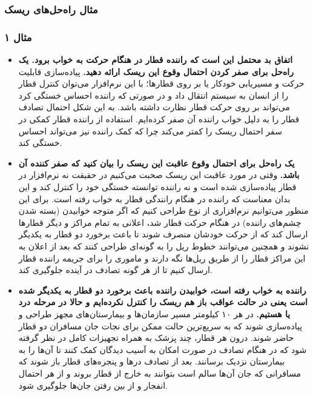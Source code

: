 \subsubsection{مثال راه‌حل‌های ریسک}

\subsubsection*{مثال ۱}

\begin{itemize}
    \item \textbf{اتفاق بد محتمل این است که راننده قطار در هنگام حرکت به خواب
    برود. یک راه‌حل برای صفر کردن احتمال وقوع این ریسک ارائه دهید.} پیاده‌سازی
    قابلیت حرکت و مسیریابی خودکار یا  بر روی قطا‌ر‌ها؛ با این
    نرم‌افزار می‌توان کنترل قطار را از انسان به سیستم انتقال داد و در صورتی که
    راننده احساس خستگی کرد می‌تواند بر روی حرکت قطار نظارت داشته باشد. به این
    شکل احتمال تصادف قطار را به دلیل خواب راننده آن صفر کرده‌ایم. استفاده از
    راننده قطار کمکی در سفر احتمال ریسک را کمتر می‌کند چرا که کمک راننده نیز
    می‌تواند احساس خستگی کند.
    \item \textbf{یک راه‌حل برای احتمال وقوع عاقبت این ریسک را بیان کنید که صفر
    کننده آن باشد.} وقتی در مورد عاقبت این ریسک صحبت می‌کنیم در حقیقت نه
    نرم‌افزار  در قطار پیاده‌سازی شده است و نه راننده توانسته
    خستگی خود را کنترل کند و این بدان معناست که راننده در هنگام رانندگی قطار به
    خواب رفته است. برای این منظور می‌توانیم نرم‌افزاری از نوع  طراحی کنیم
    که اگر متوجه خوابیدن (بسته شدن چشم‌های راننده) در هنگام حرکت قطار شد، اعلانی
    به تمام مراکز و دیگر قطار‌ها ارسال کند که از حرکت خودشان منصرف شوند تا باعث
    برخورد دو قطار به یکدیگر نشوند و همچنین می‌توانند خطوط ریل را به گونه‌ای
    طراحی کنند که بعد از اعلان به این مراکز قطار را از طریق ریل‌ها نگه دارند و
    ماموری را برای جریمه راننده قطار ارسال کنیم تا از هر گونه تصادف در آینده
    جلوگیری کند.
    \item \textbf{راننده به خواب رفته است، خوابیدن راننده باعث برخورد دو قطار به
    یکدیگر شده است یعنی در حالت عواقب باز هم ریسک را کنترل نکرده‌ایم و حالا در
    مرحله درد یا  هستیم.} در هر ۱۰ کیلومتر مسیر سازمان‌ها و
    بیمارستان‌های مجهز طراحی و پیاده‌سازی شوند که به سریع‌ترین حالت ممکن برای
    نجات جان مسافران دو قطار حاضر شوند. درون هر قطار، چند پزشک به همراه تجهیزات
    کامل در نظر گرفته شود که در هنگام تصادف در صورت امکان به آسیب دیدگان کمک
    کنند تا آن‌ها را به بیمارستان نزدیک برسانند. بعد از تصادف در‌ها و پنجره‌های
    قطار باز شوند که مسافرانی که جان آن‌ها سالم است بتوانند به خارج از قطار
    بروند و از هر احتمال انفجار و از بین رفتن جان‌ها جلوگیری شود.
\end{itemize}


